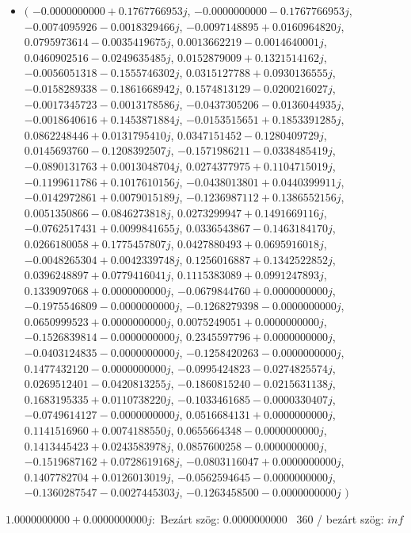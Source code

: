 \documentclass[14pt,a4paper]{article}
\begin{document}
\begin{itemize}
\item
$\big($
$-0.0000000000+0.1767766953j$, $-0.0000000000-0.1767766953j$, $-0.0074095926-0.0018329466j$, $-0.0097148895+0.0160964820j$, $0.0795973614-0.0035419675j$, $0.0013662219-0.0014640001j$, $0.0460902516-0.0249635485j$, $0.0152879009+0.1321514162j$, $-0.0056051318-0.1555746302j$, $0.0315127788+0.0930136555j$, $-0.0158289338-0.1861668942j$, $0.1574813129-0.0200216027j$, $-0.0017345723-0.0013178586j$, $-0.0437305206-0.0136044935j$, $-0.0018640616+0.1453871884j$, $-0.0153515651+0.1853391285j$, $0.0862248446+0.0131795410j$, $0.0347151452-0.1280409729j$, $0.0145693760-0.1208392507j$, $-0.1571986211-0.0338485419j$, $-0.0890131763+0.0013048704j$, $0.0274377975+0.1104715019j$, $-0.1199611786+0.1017610156j$, $-0.0438013801+0.0440399911j$, $-0.0142972861+0.0079015189j$, $-0.1236987112+0.1386552156j$, $0.0051350866-0.0846273818j$, $0.0273299947+0.1491669116j$, $-0.0762517431+0.0099841655j$, $0.0336543867-0.1463184170j$, $0.0266180058+0.1775457807j$, $0.0427880493+0.0695916018j$, $-0.0048265304+0.0042339748j$, $0.1256016887+0.1342522852j$, $0.0396248897+0.0779416041j$, $0.1115383089+0.0991247893j$, $0.1339097068+0.0000000000j$, $-0.0679844760+0.0000000000j$, $-0.1975546809-0.0000000000j$, $-0.1268279398-0.0000000000j$, $0.0650999523+0.0000000000j$, $0.0075249051+0.0000000000j$, $-0.1526839814-0.0000000000j$, $0.2345597796+0.0000000000j$, $-0.0403124835-0.0000000000j$, $-0.1258420263-0.0000000000j$, $0.1477432120-0.0000000000j$, $-0.0995424823-0.0274825574j$, $0.0269512401-0.0420813255j$, $-0.1860815240-0.0215631138j$, $0.1683195335+0.0110738220j$, $-0.1033461685-0.0000330407j$, $-0.0749614127-0.0000000000j$, $0.0516684131+0.0000000000j$, $0.1141516960+0.0074188550j$, $0.0655664348-0.0000000000j$, $0.1413445423+0.0243583978j$, $0.0857600258-0.0000000000j$, $-0.1519687162+0.0728619168j$, $-0.0803116047+0.0000000000j$, $0.1407782704+0.0126013019j$, $-0.0562594645-0.0000000000j$, $-0.1360287547-0.0027445303j$, $-0.1263458500-0.0000000000j$
$\big)$
\end{itemize}
$1.0000000000+0.0000000000j$:\
Bezárt szög: $0.0000000000$ \
360 / bezárt szög: $inf$\
\end{document}
